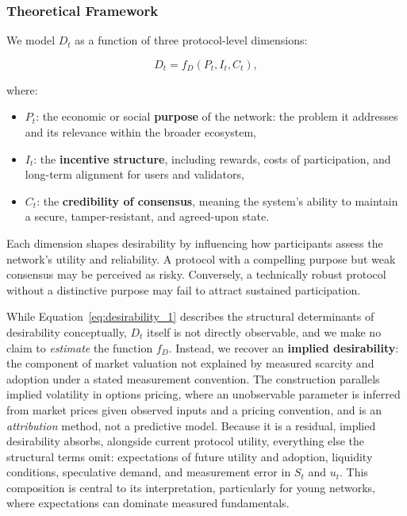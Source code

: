 \documentclass[12pt]{article}
\begin{document}
\subsubsection{Theoretical Framework}

We model \( D_t \) as a function of three protocol-level dimensions:

\begin{equation}
D_t = f_D(P_t, I_t, C_t),
\label{eq:desirability_1}
\end{equation}

\noindent where:
\begin{itemize}
    \item \( P_t \): the economic or social \textbf{purpose} of the network: the problem it addresses and its relevance within the broader ecosystem,
    \item \( I_t \): the \textbf{incentive structure}, including rewards, costs of participation, and long-term alignment for users and validators,
    \item \( C_t \): the \textbf{credibility of consensus}, meaning the system’s ability to maintain a secure, tamper-resistant, and agreed-upon state.
\end{itemize}

Each dimension shapes desirability by influencing how participants assess the network’s utility and reliability. A protocol with a compelling purpose but weak consensus may be perceived as risky. Conversely, a technically robust protocol without a distinctive purpose may fail to attract sustained participation.

While Equation~\eqref{eq:desirability_1} describes the structural determinants of desirability conceptually, \( D_t \) itself is not directly observable, and we make no claim to \emph{estimate} the function \( f_D \). Instead, we recover an \textbf{implied desirability}: the component of market valuation not explained by measured scarcity and adoption under a stated measurement convention. The construction parallels implied volatility in options pricing, where an unobservable parameter is inferred from market prices given observed inputs and a pricing convention, and is an \emph{attribution} method, not a predictive model. Because it is a residual, implied desirability absorbs, alongside current protocol utility, everything else the structural terms omit: expectations of future utility and adoption, liquidity conditions, speculative demand, and measurement error in \( S_t \) and \( u_t \). This composition is central to its interpretation, particularly for young networks, where expectations can dominate measured fundamentals.
\end{document}
